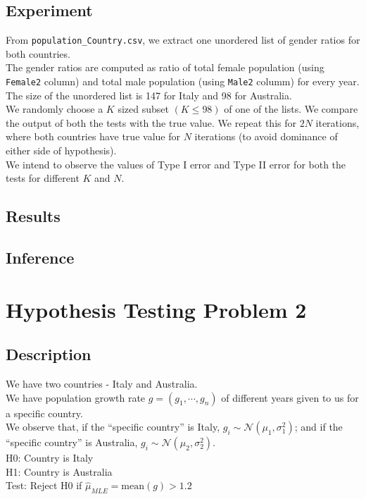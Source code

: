 \documentclass[fleqn, 11pt]{article}
\begin{document}
\subsection{Experiment}
From \verb!population_Country.csv!, we extract one unordered list of gender ratios for both countries. \\
The gender ratios are computed as ratio of total female population (using \verb!Female2! column) and total male population (using \verb!Male2! columm) for every year. \\
The size of the unordered list is 147 for Italy and 98 for Australia. \\
We randomly choose a $K$ sized subset $(K \le 98)$ of one of the lists. We compare the output of both the tests with the true value. We repeat this for $2N$ iterations, where both countries have true value for $N$ iterations (to avoid dominance of either side of hypothesis). \\
We intend to observe the values of Type I error and Type II error for both the tests for different $K$ and $N$.

\subsection{Results}


\subsection{Inference}


\newpage
\section{Hypothesis Testing Problem 2}
\subsection{Description}
We have two countries - Italy and Australia. \\
We have population growth rate $g = (g_1, \cdots ,g_n)$ of different years given to us for a specific country. \\
We observe that, if the ``specific country'' is Italy, $g_i \sim \mathcal{N}(\mu_1, \sigma_1^2)$; and if the ``specific country'' is Australia, $g_i \sim \mathcal{N}(\mu_2, \sigma_2^2)$. \\
H0: Country is Italy \\
H1: Country is Australia \\
Test: Reject H0 if $\hat{\mu}_{MLE} = \mathrm{mean}(g) > 1.2$
\end{document}
